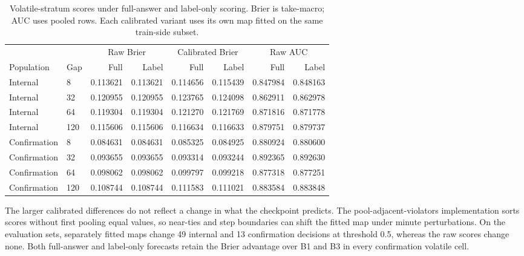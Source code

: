 \documentclass[10pt]{article}
\begin{document}
\begin{table}[h]
\centering
\caption{Volatile-stratum scores under full-answer and label-only scoring. Brier is take-macro; AUC uses pooled rows. Each calibrated variant uses its own map fitted on the same train-side subset.}
\label{tab:tokens}
\begin{tabular}{llrrrrrr}
\toprule
& & \multicolumn{2}{c}{Raw Brier} & \multicolumn{2}{c}{Calibrated Brier} & \multicolumn{2}{c}{Raw AUC} \\
\cmidrule(lr){3-4}\cmidrule(lr){5-6}\cmidrule(lr){7-8}
Population & Gap & Full & Label & Full & Label & Full & Label \\
\midrule
Internal & 8 & 0.113621 & 0.113621 & 0.114656 & 0.115439 & 0.847984 & 0.848163 \\
Internal & 32 & 0.120955 & 0.120955 & 0.123765 & 0.124098 & 0.862911 & 0.862978 \\
Internal & 64 & 0.119304 & 0.119304 & 0.121270 & 0.121769 & 0.871816 & 0.871778 \\
Internal & 120 & 0.115606 & 0.115606 & 0.116634 & 0.116633 & 0.879751 & 0.879737 \\
\midrule
Confirmation & 8 & 0.084631 & 0.084631 & 0.085325 & 0.084925 & 0.880924 & 0.880600 \\
Confirmation & 32 & 0.093655 & 0.093655 & 0.093314 & 0.093244 & 0.892365 & 0.892630 \\
Confirmation & 64 & 0.098062 & 0.098062 & 0.099797 & 0.099218 & 0.877318 & 0.877251 \\
Confirmation & 120 & 0.108744 & 0.108744 & 0.111583 & 0.111021 & 0.883584 & 0.883848 \\
\bottomrule
\end{tabular}
\end{table}

The larger calibrated differences do not reflect a change in what the checkpoint predicts. The pool-adjacent-violators implementation sorts scores without first pooling equal values, so near-ties and step boundaries can shift the fitted map under minute perturbations. On the evaluation sets, separately fitted maps change 49 internal and 13 confirmation decisions at threshold 0.5, whereas the raw scores change none. Both full-answer and label-only forecasts retain the Brier advantage over B1 and B3 in every confirmation volatile cell.
\end{document}
